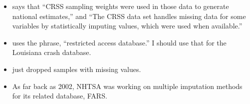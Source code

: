 \begin{itemize}
	\item \cite{MUELLER2022305} says that ``CRSS sampling weights were used in those data to generate national estimates,'' and ``The CRSS data set handles missing data for some variables by statistically imputing values, which were used when available.''
	
	\item \cite{KAPLAN2017130} uses the phrase, ``restricted access database.''  I should use that for the Louisiana crash database.  
	
	\item \cite{GONG2022100190} just dropped samples with missing values.  
	
	\item As far back as 2002, NHTSA was working on multiple imputation methods for its related database, FARS.  \citep{subramanian2002transitioning}
		
\end{itemize}
